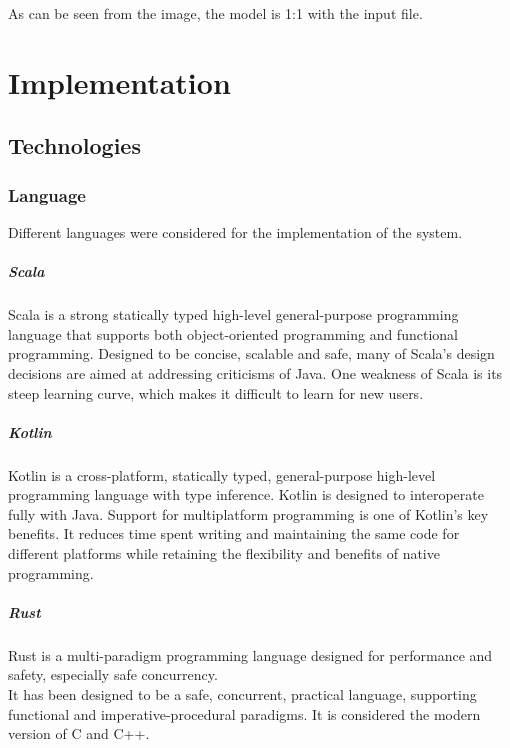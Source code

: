 \documentclass[12pt,a4paper,openright,twoside]{book}
\begin{document}
As can be seen from the image, the model is 1:1 with the input file.

\chapter{Implementation}

\section{Technologies}

\subsection*{Language}
Different languages were considered for the implementation of the system.

\paragraph*{Scala}
Scala is a strong statically typed high-level general-purpose programming language that supports both object-oriented 
programming and functional programming. 
Designed to be concise, scalable and safe, many of Scala's design decisions are aimed at addressing criticisms of Java.
One weakness of Scala is its steep learning curve, which makes it difficult to learn for new users.

\paragraph*{Kotlin}
Kotlin is a cross-platform, statically typed, general-purpose high-level programming language with type inference. 
Kotlin is designed to interoperate fully with Java.
Support for multiplatform programming is one of Kotlin’s key benefits. It reduces time spent writing and maintaining 
the same code for different platforms while retaining the flexibility and benefits of native programming.

\paragraph*{Rust}

Rust is a multi-paradigm programming language designed for performance and safety, especially safe concurrency. \\
It has been designed to be a safe, concurrent, practical language, supporting functional and imperative-procedural paradigms.
It is considered the modern version of C and C++.
\end{document}
